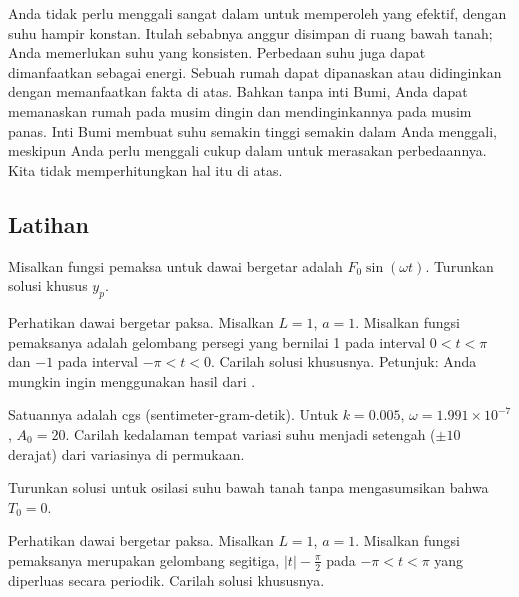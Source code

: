 Anda tidak perlu menggali sangat dalam untuk memperoleh
 yang efektif, dengan suhu hampir konstan.  Itulah sebabnya anggur disimpan di ruang bawah tanah; Anda memerlukan
suhu yang konsisten.
Perbedaan suhu juga dapat dimanfaatkan sebagai energi.  Sebuah rumah dapat
dipanaskan atau didinginkan dengan memanfaatkan fakta di atas.
Bahkan tanpa inti Bumi, Anda dapat memanaskan rumah pada musim dingin dan mendinginkannya
pada musim panas.  Inti Bumi membuat
suhu semakin tinggi semakin dalam Anda menggali, meskipun Anda perlu menggali cukup
dalam untuk merasakan perbedaannya.
Kita tidak memperhitungkan hal itu di atas.

\subsection{Latihan}

\begin{exercise} \label{sps:sinforceexr}
Misalkan fungsi pemaksa untuk dawai bergetar
adalah $F_0 \sin (\omega t)$.  Turunkan solusi khusus $y_p$.
\end{exercise}

\begin{exercise}
Perhatikan dawai bergetar paksa.
Misalkan $L=1$, $a=1$.  Misalkan fungsi pemaksanya
adalah gelombang persegi yang bernilai 1 pada interval $0 < t < \pi$ dan
$-1$ pada interval $-\pi < t < 0$.
Carilah solusi khususnya.  Petunjuk: Anda mungkin ingin menggunakan hasil
dari .
\end{exercise}

\begin{exercise}
Satuannya adalah cgs (sentimeter-gram-detik).
Untuk $k=0.005$, $\omega = 1.991 \times {10}^{-7}$, $A_0 = 20$.
Carilah kedalaman tempat variasi suhu menjadi setengah ($\pm 10$
derajat) dari variasinya di permukaan.
\end{exercise}

\begin{exercise}
Turunkan solusi untuk osilasi suhu bawah tanah tanpa mengasumsikan
bahwa $T_0 = 0$.
\end{exercise}

\setcounter{exercise}{100}

\begin{exercise}
Perhatikan dawai bergetar paksa.
Misalkan $L=1$, $a=1$.  Misalkan fungsi pemaksanya
merupakan gelombang segitiga, $\lvert t \rvert -\frac{\pi}{2}$
pada $-\pi < t < \pi$ yang diperluas secara periodik.
Carilah solusi khususnya.
\end{exercise}

